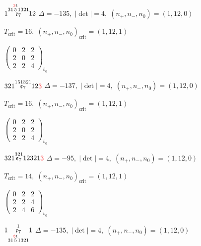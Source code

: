 \documentclass[10pt]{article}
\begin{document}
\smallskip

$1\overset{31\overset{\textcolor{red}{3}1}{5}1321}{\mathfrak{e}_7}12$ \quad $\Delta=-135,\; |\det|=4,\; (n_+,n_-,n_0)=(1,12,0)$

\hspace{1em}$T_{\text{crit}}=16,\; (n_+,n_-,n_0)_{\text{crit}}=(1,12,1)$

\hspace{2em}$\left(\begin{smallmatrix}0 & 2 & 2 \\ 2 & 0 & 2 \\ 2 & 2 & 4\end{smallmatrix}\right)_{\!b_0}$

\smallskip

$321\overset{151321}{\mathfrak{e}_7}12\textcolor{red}{3}$ \quad $\Delta=-137,\; |\det|=4,\; (n_+,n_-,n_0)=(1,12,0)$

\hspace{1em}$T_{\text{crit}}=16,\; (n_+,n_-,n_0)_{\text{crit}}=(1,12,1)$

\hspace{2em}$\left(\begin{smallmatrix}0 & 2 & 2 \\ 2 & 0 & 2 \\ 2 & 2 & 4\end{smallmatrix}\right)_{\!b_0}$

\smallskip

$321\overset{321}{\mathfrak{e}_7}12321\textcolor{red}{3}$ \quad $\Delta=-95,\; |\det|=4,\; (n_+,n_-,n_0)=(1,12,0)$

\hspace{1em}$T_{\text{crit}}=14,\; (n_+,n_-,n_0)_{\text{crit}}=(1,12,1)$

\hspace{2em}$\left(\begin{smallmatrix}0 & 2 & 2 \\ 2 & 2 & 4 \\ 2 & 4 & 6\end{smallmatrix}\right)_{\!b_0}$

\smallskip

$1\overset{1}{\underset{31\overset{\textcolor{red}{3}1}{5}1321}{\mathfrak{e}_7}}1$ \quad $\Delta=-135,\; |\det|=4,\; (n_+,n_-,n_0)=(1,12,0)$
\end{document}

